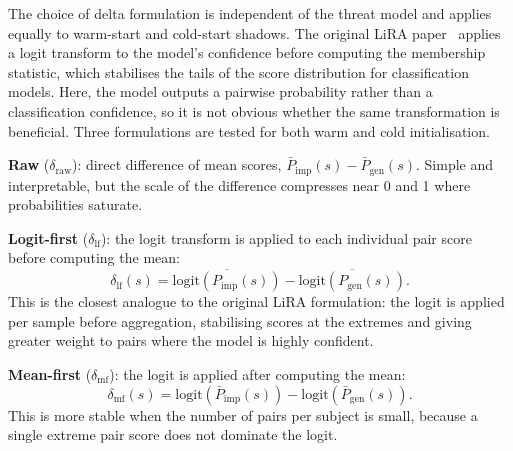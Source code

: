 The choice of delta formulation is independent of the threat model and applies equally to warm-start and cold-start shadows. The original LiRA paper~\cite{carlini2022membership} applies a logit transform to the model's confidence before computing the membership statistic, which stabilises the tails of the score distribution for classification models. Here, the model outputs a pairwise probability rather than a classification confidence, so it is not obvious whether the same transformation is beneficial. Three formulations are tested for both warm and cold initialisation.

\textbf{Raw} ($\delta_\text{raw}$): direct difference of mean scores,
$\bar{P}_\text{imp}(s) - \bar{P}_\text{gen}(s)$. Simple and interpretable, but the scale of the difference compresses near 0 and 1 where probabilities saturate.

\textbf{Logit-first} ($\delta_\text{lf}$): the logit transform is applied to
each individual pair score before computing the mean:
\begin{equation}
  \delta_\text{lf}(s)
  = \overline{\mathrm{logit}\!\left(P_\text{imp}(s)\right)}
  - \overline{\mathrm{logit}\!\left(P_\text{gen}(s)\right)}.
\end{equation}
This is the closest analogue to the original LiRA formulation: the logit is applied per sample before aggregation, stabilising scores at the extremes and giving greater weight to pairs where the model is highly confident.

\textbf{Mean-first} ($\delta_\text{mf}$): the logit is applied after computing
the mean:
\begin{equation}
  \delta_\text{mf}(s)
  = \mathrm{logit}\!\left(\bar{P}_\text{imp}(s)\right)
  - \mathrm{logit}\!\left(\bar{P}_\text{gen}(s)\right).
\end{equation}
This is more stable when the number of pairs per subject is small, because a single extreme pair score does not dominate the logit.

